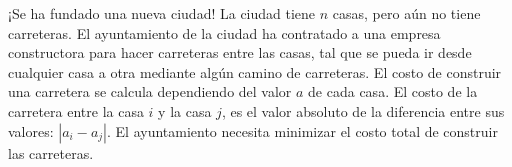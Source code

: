 
%
¡Se ha fundado una nueva ciudad! La ciudad tiene $n$ casas, pero aún no tiene carreteras. El ayuntamiento de la ciudad ha contratado a una empresa constructora para hacer carreteras entre las casas, tal que se pueda ir desde cualquier casa a otra mediante algún camino de carreteras. El costo de construir una carretera se calcula dependiendo del valor $a$ de cada casa. El costo de la carretera entre la casa $i$ y la casa $j$, es el valor absoluto de la diferencia entre sus valores: $ \left| a_i - a_j \right|$. El ayuntamiento necesita minimizar el costo total de construir las carreteras.

%
%

%
%



\sampleio
